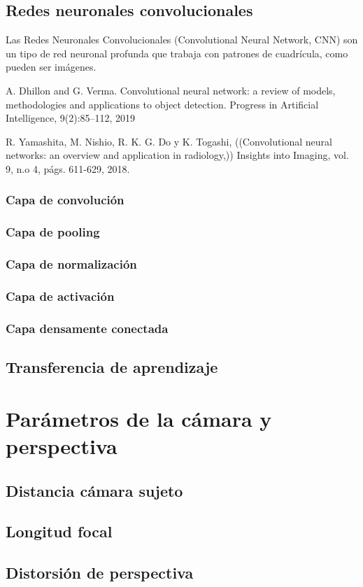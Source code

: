 \subsection{Redes neuronales convolucionales}
Las Redes Neuronales Convolucionales (Convolutional Neural Network, CNN) \cite{35, 36, 37} son un tipo de red neuronal profunda que trabaja con patrones de cuadrícula, como pueden ser imágenes.


















A. Dhillon and G. Verma. Convolutional neural network: a review of models, methodologies and applications to object detection. Progress
in Artificial Intelligence, 9(2):85–112, 2019

R. Yamashita, M. Nishio, R. K. G. Do y K. Togashi, ((Convolutional neural networks: an overview and application in radiology,)) Insights
into Imaging, vol. 9, n.o 4, págs. 611-629, 2018.

\subsubsection*{Capa de convolución}

\subsubsection*{Capa de pooling}

\subsubsection*{Capa de normalización}

\subsubsection*{Capa de activación}

\subsubsection*{Capa densamente conectada}

\subsection{Transferencia de aprendizaje}

\section{Parámetros de la cámara y perspectiva}
	
\subsection*{Distancia cámara sujeto}

\subsection*{Longitud focal}
	
\subsection*{Distorsión de perspectiva}

